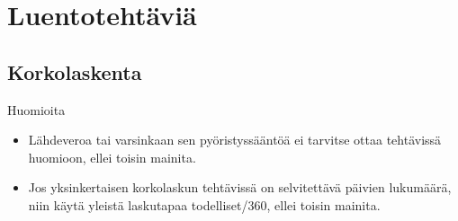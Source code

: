 \documentclass[a4paper,10pt,twoside]{article}
\begin{document}
\pagestyle{empty}

\section*{Luentotehtäviä}

\subsection*{Korkolaskenta}

Huomioita
\begin{itemize}
    \item Lähdeveroa tai varsinkaan sen pyöristyssääntöä ei tarvitse ottaa tehtävissä huomioon, ellei toisin mainita.
    \item Jos yksinkertaisen korkolaskun tehtävissä on selvitettävä päivien lukumäärä, niin käytä yleistä laskutapaa todelliset/360, ellei toisin mainita.
\end{itemize}
\end{document}
